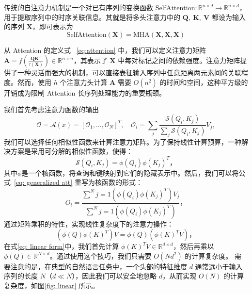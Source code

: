 \label{subsubsec:self-attention}
传统的自注意力机制是一个对已有序列的变换函数 $\mathrm{SelfAttention}: \mathbb{R}^{n\times d} \rightarrow \mathbb{R}^{n\times d}$，用于提取序列中的时序关联信息。其就是将多头注意力中的 $\boldsymbol{Q}, \ \boldsymbol{K}, \ \boldsymbol{V}$ 都设为输入的序列 $\boldsymbol{X}$，即可表示为
\begin{equation}\label{eq:self-attention}
\mathrm{SelfAttention}(\boldsymbol{X}) = \mathrm{MHA}(\boldsymbol{X}, \boldsymbol{X}, \boldsymbol{X})
\end{equation}

\label{subsubsec:attn-complexity}

从 Attention 的定义式 ~\ref{eq:attention} 中，我们可以定义注意力矩阵 $\boldsymbol{A}=f(\frac{\boldsymbol{Q}{\boldsymbol{K}}^{T}}{\tau(\boldsymbol{X})})\in \mathbb{R}^{n\times n}$，其表示了 $\boldsymbol{X}$ 中每对标记之间的依赖强度。注意力矩阵提供了一种灵活而强大的机制，可以直接表征输入序列中任意距离两元素间的关联程度。然而，使用 $h$ 个注意力头计算 $\boldsymbol{A}$ 需要 $O(n^2)$ 的时间和空间，这种平方级的开销成为限制 Attention 长序列处理能力的重要瓶颈。


\label{sec:linearattn}
我们首先考虑注意力函数的输出
\begin{equation}
   \mathcal{O} = \mathcal{A}(x) = \left[\mathcal{O}_1,\hdots, \mathcal{O}_N \right]^T, \quad \mathcal{O}_i
 = \sum_j \frac{\mathcal{S}(Q_i,K_j)}{\sum_j \mathcal{S}(Q_i,K_j)}V_j,
    \label{eq: generalized att}
\end{equation}
我们可以选择任何相似性函数来计算注意力矩阵。为了保持线性计算预算，一种解决方案是采用可分解的相似性函数，使得：
\begin{equation}
\textstyle{
\mathcal{S}(Q_i, K_j) = \phi(Q_i)\phi(K_j)^T，
\label{eq: decompose}
}\end{equation}
其中$\phi$是一个核函数，将查询和键映射到它们的隐藏表示中。然后，我们可以将公式~\ref{eq: generalized att} 重写为核函数的形式：
\begin{equation}
\textstyle{
O_i = \frac{\sum^{N}{j=1}(\phi (Q_i) \phi({K_j})^T) V_j}{\sum^{N}{j=1}(\phi (Q_i) \phi({K_j})^T)}，
\label{eq: rewrite att}
}\end{equation}
通过矩阵乘积的特性，实现线性复杂度下的注意力操作：
\begin{equation}
\textstyle{
(\phi (Q) \phi({K})^T) V = \phi (Q) (\phi({K})^T V)，
\label{eq: linear form}
}\end{equation}
在式\eqref{eq: linear form}中，我们首先计算 $\phi({K})^T V \in\mathbb{R}^{d \times d}$，然后再乘以 $\phi(Q)\in\mathbb{R}^{N \times d}$。通过使用这个技巧，我们只需要 $O(Nd^2)$ 的计算复杂度。
需要注意的是，在典型的自然语言任务中，一个头部的特征维度 $d$ 通常远小于输入序列的长度 $N$（$d\ll N$），因此我们可以安全地忽略 $d$，从而实现 $O(N)$ 的计算复杂度，如图\ref{fig: linear} 所示。

